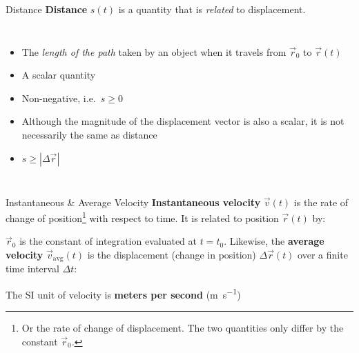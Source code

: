 \documentclass[12pt,compress,aspectratio=169,dvipsnames]{beamer}
\begin{document}
\begin{frame}{Distance}
  \textbf{Distance} $s(t)$ is a quantity that is \emph{related} to displacement.
  \begin{columns}
    \begin{itemize}
    \item The \emph{length of the path} taken by an object when it travels from
      $\vec r_0$ to $\vec r(t)$
    \item A scalar quantity
    \item Non-negative, i.e.\ $s\geq 0$
    \item Although the magnitude of the displacement vector is also a scalar,
      it is not necessarily the same as distance
    \item $s\geq |\Delta\vec r|$
    \end{itemize}
    
  \end{columns}
\end{frame}



\begin{frame}{Instantaneous \& Average Velocity}
  \textbf{Instantaneous velocity} $\vec v(t)$ is the rate of change of
  position\footnote{Or the rate of change of displacement. The two quantities
  only differ by the constant $\vec r_0$.} with respect to time. It is related
  to position $\vec r(t)$ by:


  $\vec r_0$ is the constant of integration evaluated at $t=t_0$. Likewise, the
  \textbf{average velocity} $\vec v_\text{avg}(t)$ is the displacement (change
  in position) $\Delta\vec r(t)$ over a finite time interval $\Delta t$:


  The SI unit of velocity is \textbf{meters per second} (\si{\metre\per\second})
  \vspace{.2in}
\end{frame}
\end{document}
